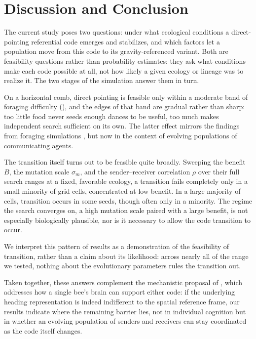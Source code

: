 \documentclass[11pt]{article}
\begin{document}
\section{Discussion and Conclusion}
\label{sec:discussion}

The current study poses two questions: under what ecological conditions a
direct-pointing referential code emerges and stabilizes, and which factors let
a population move from this code to its gravity-referenced variant. Both are
feasibility questions rather than probability estimates: they ask what
conditions make each code possible at all, not how likely a given ecology or
lineage was to realize it. The two stages of the simulation answer them in
turn.

On a horizontal comb, direct pointing is feasible only within a moderate band
of foraging difficulty (), and the edges of that band are
gradual rather than sharp: too little food never seeds enough dances to be
useful, too much makes independent search sufficient on its own. The latter effect
mirrors the findings from foraging simulations
\citep{dornhaus2006benefits,beekman2008pay}, but now in the context of
evolving populations of communicating agents.

The transition itself turns out to be feasible quite broadly. Sweeping the
benefit $B$, the mutation scale $\sigma_m$, and the sender--receiver
correlation $\rho$ over their full search ranges at a fixed, favorable
ecology, a transition fails completely only in a small minority of grid
cells, concentrated at low benefit. In a large majority of cells, transition
occurs in some seeds, though often only in a minority. The regime the search
converges on, a high mutation scale paired with a large benefit, is not
especially biologically plausible, nor is it necessary to allow the code
transition to occur.

We interpret this pattern of results as a demonstration of the feasibility of
transition, rather than a claim about its likelihood: across nearly all of
the range we tested, nothing about the evolutionary parameters rules the
transition out.

Taken together, these answers complement the mechanistic proposal of
\citet{10.1242/jeb.142778}, which addresses how a single bee's brain can
support either code: if the underlying heading representation is indeed
indifferent to the spatial reference frame, our results indicate where the
remaining barrier lies, not in individual cognition but in whether an
evolving population of senders and receivers can stay coordinated as the code
itself changes.
\end{document}
